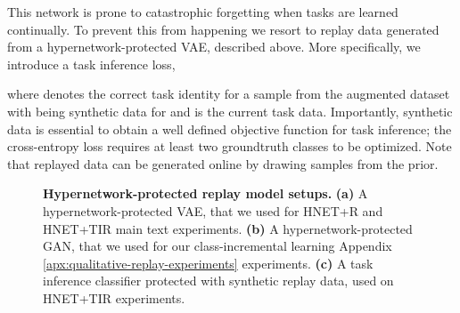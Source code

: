 \documentclass{article}
\begin{document}
This network is prone to catastrophic forgetting when tasks are learned continually. To prevent this from happening we resort to replay data generated from a hypernetwork-protected VAE, described above. More specifically, we introduce a task inference loss,

where  denotes the correct task identity for a sample  from the augmented dataset  with  being synthetic data  for  and  is the current task data. Importantly, synthetic data is essential to obtain a well defined objective function for task inference; the cross-entropy loss  requires at least two groundtruth classes to be optimized. Note that replayed data can be generated online by drawing samples  from the prior.

\begin{figure}[htbp]
  \caption{\textbf{Hypernetwork-protected replay model setups.} \textbf{(a)} A hypernetwork-protected VAE, that we used for HNET+R and HNET+TIR main text experiments. \textbf{(b)} A hypernetwork-protected GAN, that we used for our class-incremental learning Appendix \ref{apx:qualitative-replay-experiments} experiments. \textbf{(c)} A task inference classifier protected with synthetic replay data, used on HNET+TIR experiments. \label{fig:replay-setups}} 
\end{figure}
\end{document}
